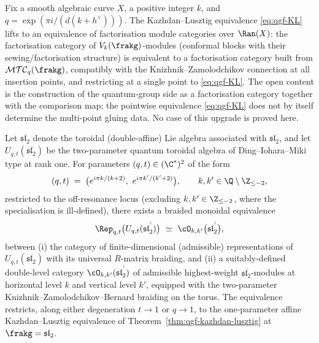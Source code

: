 \begin{conjecture}
\label{conj:qgf-kl-chiral-upgrade}
Fix a smooth algebraic curve $X$, a positive integer $k$, and $q = \exp(\pi i / (d(k + h^\vee)))$. The Kazhdan--Lusztig equivalence \eqref{eq:qgf-KL} lifts to an equivalence of factorisation module categories over $\Ran(X)$: the factorisation category of $V_k(\frakg)$-modules (conformal blocks with their sewing/factorisation structure) is equivalent to a factorisation category built from $\mathcal{MTC}_q(\frakg)$, compatibly with the Knizhnik--Zamolodchikov connection at all insertion points, and restricting at a single point to \eqref{eq:qgf-KL}. The open content is the construction of the quantum-group side as a factorisation category together with the comparison map; the pointwise equivalence \eqref{eq:qgf-KL} does not by itself determine the multi-point gluing data. No case of this upgrade is proved here.
\end{conjecture}

\begin{conjecture}
\label{conj:kazhdan-lusztig-toroidal-sl2}
Let $\mathfrak{sl}_2^{\hat{\hat{\ }}}$ denote the toroidal (double-affine) Lie algebra associated with $\mathfrak{sl}_2$, and let $U_{q,t}(\mathfrak{sl}_2^{\hat{\hat{\ }}})$ be the two-parameter quantum toroidal algebra of Ding--Iohara--Miki type at rank one. For parameters $(q, t) \in (\C^*)^2$ of the form
\[
 (q, t) \;=\; \bigl(e^{i\pi k/(k+2)},\ e^{i\pi k'/(k'+2)}\bigr),
 \qquad k, k' \in \Q \setminus \Z_{\le -2},
\]
restricted to the off-resonance locus (excluding $k, k' \in \Z_{\le -2}$, where the specialisation is ill-defined), there exists a braided monoidal equivalence
\begin{equation}
 \Rep_{q,t}\bigl(U_{q,t}(\mathfrak{sl}_2^{\hat{\hat{\ }}})\bigr)
 \ \simeq\ \cO_{k,k'}\bigl(\mathfrak{sl}_2^{\hat{\hat{\ }}}\bigr),
 \label{eq:kl-toroidal-sl2}
\end{equation}
between (i) the category of finite-dimensional (admissible) representations of $U_{q,t}(\mathfrak{sl}_2^{\hat{\hat{\ }}})$ with its universal $R$-matrix braiding, and (ii) a suitably-defined double-level category $\cO_{k,k'}(\mathfrak{sl}_2^{\hat{\hat{\ }}})$ of admissible highest-weight $\mathfrak{sl}_2^{\hat{\hat{\ }}}$-modules at horizontal level $k$ and vertical level $k'$, equipped with the two-parameter Knizhnik--Zamolodchikov--Bernard braiding on the torus. The equivalence restricts, along either degeneration $t \to 1$ or $q \to 1$, to the one-parameter affine Kazhdan--Lusztig equivalence of Theorem~\ref{thm:qgf-kazhdan-lusztig} at $\frakg = \mathfrak{sl}_2$.
\end{conjecture}

